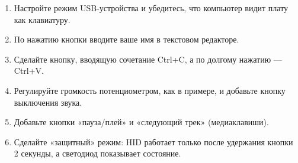 \begin{tasks}
\begin{enumerate}
\item {} Настройте режим USB-устройства и убедитесь, что компьютер видит плату как клавиатуру.
\item {} По нажатию кнопки вводите ваше имя в текстовом редакторе.
\item {} Сделайте кнопку, вводящую сочетание Ctrl+C, а по долгому нажатию --- Ctrl+V.
\item {} Регулируйте громкость потенциометром, как в примере, и добавьте кнопку выключения звука.
\item {} Добавьте кнопки «пауза/плей» и «следующий трек» (медиаклавиши).
\item {} Сделайте «защитный» режим: HID работает только после удержания кнопки 2 секунды, а светодиод показывает состояние.
\end{enumerate}
\end{tasks}
